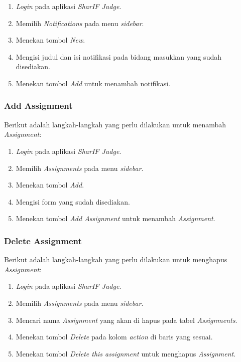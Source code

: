 \begin{enumerate}
	\item \textit{Login} pada aplikasi \textit{SharIF Judge}.
	\item Memilih \textit{Notifications} pada menu \textit{sidebar}.
	\item Menekan tombol \textit{New}.
	\item Mengisi judul dan isi notifikasi pada bidang masukkan yang sudah disediakan.
	\item Menekan tombol \textit{Add} untuk menambah notifikasi.
\end{enumerate}

\subsubsection{Add Assignment}
\label{subsubsec:skenario_add_assignment}
Berikut adalah langkah-langkah yang perlu dilakukan untuk menambah \textit{Assignment}:

\begin{enumerate}
	\item \textit{Login} pada aplikasi \textit{SharIF Judge}.
	\item Memilih \textit{Assignments} pada menu \textit{sidebar}.
	\item Menekan tombol \textit{Add}.
	\item Mengisi form yang sudah disediakan.
	\item Menekan tombol \textit{Add Assignment} untuk menambah \textit{Assignment}.
\end{enumerate}

\subsubsection{Delete Assignment}
\label{subsubsec:skenario_delete_assignment}
Berikut adalah langkah-langkah yang perlu dilakukan untuk menghapus \textit{Assignment}:

\begin{enumerate}
	\item \textit{Login} pada aplikasi \textit{SharIF Judge}.
	\item Memilih \textit{Assignments} pada menu \textit{sidebar}.
	\item Mencari nama \textit{Assignment} yang akan di hapus pada tabel \textit{Assignments}.
	\item Menekan tombol \textit{Delete} pada kolom \textit{action} di baris yang sesuai.
	\item Menekan tombol \textit{Delete this assignment} untuk menghapus \textit{Assignment}.
\end{enumerate}

